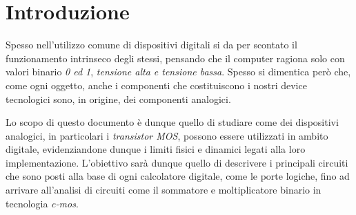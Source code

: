 \section*{Introduzione}
	Spesso nell'utilizzo comune di dispositivi digitali si da per scontato il funzionamento intrinseco degli stessi, pensando che il computer ragiona solo con valori binario \textit{0 ed 1}, \textit{tensione alta e tensione bassa}. Spesso si dimentica però che, come ogni oggetto, anche i componenti che costituiscono i nostri device tecnologici sono, in origine, dei componenti analogici.
	
	Lo scopo di questo documento è dunque quello di studiare come dei dispositivi analogici, in particolari i \textit{transistor MOS}, possono essere utilizzati in ambito digitale, evidenziandone dunque i limiti fisici e dinamici legati alla loro implementazione. L'obiettivo sarà dunque quello di descrivere i principali circuiti che sono posti alla base di ogni calcolatore digitale, come le porte logiche, fino ad arrivare all'analisi di circuiti come il sommatore e moltiplicatore binario in tecnologia \textit{c-mos}.